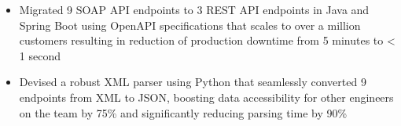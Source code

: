 \documentclass[a4paper]{article}
\begin{document}
\begin{itemize} \itemsep 1pt
        \item Migrated 9 SOAP API endpoints to 3 REST API endpoints in Java and Spring Boot using OpenAPI specifications that scales to over a million customers resulting in reduction of production downtime from 5 minutes to < 1 second
        \item Devised a robust XML parser using Python that seamlessly converted 9 endpoints from XML to JSON, boosting data accessibility for other engineers on the team by 75\% and significantly reducing parsing time by 90\%
\end{itemize}


\end{document}
